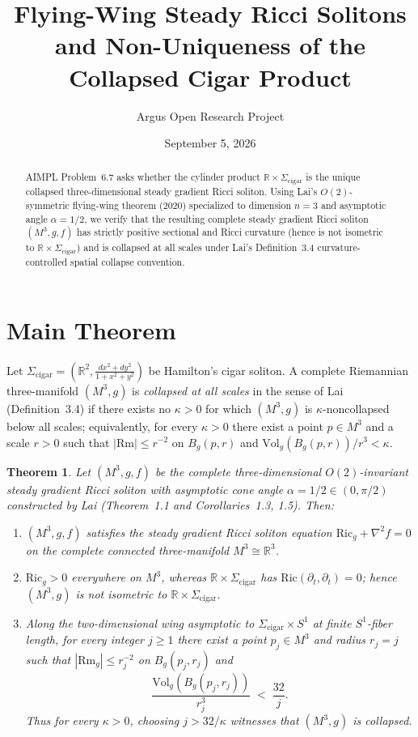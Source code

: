 \documentclass[10pt,reqno]{amsart}
\title[Flying-Wing Steady Ricci Solitons and Non-Uniqueness of the Cigar Product]
{Flying-Wing Steady Ricci Solitons and Non-Uniqueness of the Collapsed Cigar Product}
\author{Argus Open Research Project}
\date{September 5, 2026}
\newtheorem{theorem}{Theorem}[section]
\theoremstyle{definition}
\begin{document}
\begin{abstract}
AIMPL Problem~6.7 asks whether the cylinder product $\mathbb{R}\times\Sigma_{\mathrm{cigar}}$ is the unique collapsed three-dimensional steady gradient Ricci soliton. Using Lai's $O(2)$-symmetric flying-wing theorem (2020) specialized to dimension $n=3$ and asymptotic angle $\alpha=1/2$, we verify that the resulting complete steady gradient Ricci soliton $(M^3,g,f)$ has strictly positive sectional and Ricci curvature (hence is not isometric to $\mathbb{R}\times\Sigma_{\mathrm{cigar}}$) and is collapsed at all scales under Lai's Definition~3.4 curvature-controlled spatial collapse convention.
\end{abstract}
\maketitle
\section{Main Theorem}
Let $\Sigma_{\mathrm{cigar}}=(\mathbb{R}^2, \frac{dx^2+dy^2}{1+x^2+y^2})$ be Hamilton's cigar soliton. A complete Riemannian three-manifold $(M^3,g)$ is \emph{collapsed at all scales} in the sense of Lai (Definition~3.4) if there exists no $\kappa>0$ for which $(M^3,g)$ is $\kappa$-noncollapsed below all scales; equivalently, for every $\kappa>0$ there exist a point $p\in M^3$ and a scale $r>0$ such that $|\mathrm{Rm}|\le r^{-2}$ on $B_g(p,r)$ and $\mathrm{Vol}_g(B_g(p,r))/r^3 < \kappa$.
\begin{theorem}
Let $(M^3,g,f)$ be the complete three-dimensional $O(2)$-invariant steady gradient Ricci soliton with asymptotic cone angle $\alpha=1/2\in(0,\pi/2)$ constructed by Lai (Theorem~1.1 and Corollaries~1.3, 1.5). Then:
\begin{enumerate}[label=\textup{(\arabic*)}]
  \item $(M^3,g,f)$ satisfies the steady gradient Ricci soliton equation $\mathrm{Ric}_g + \nabla^2 f = 0$ on the complete connected three-manifold $M^3\cong\mathbb{R}^3$.
  \item $\mathrm{Ric}_g > 0$ everywhere on $M^3$, whereas $\mathbb{R}\times\Sigma_{\mathrm{cigar}}$ has $\mathrm{Ric}(\partial_t,\partial_t)=0$; hence $(M^3,g)$ is not isometric to $\mathbb{R}\times\Sigma_{\mathrm{cigar}}$.
  \item Along the two-dimensional wing asymptotic to $\Sigma_{\mathrm{cigar}}\times S^1$ at finite $S^1$-fiber length, for every integer $j\ge 1$ there exist a point $p_j\in M^3$ and radius $r_j=j$ such that $|\mathrm{Rm}_g|\le r_j^{-2}$ on $B_g(p_j,r_j)$ and
  \[
    \frac{\mathrm{Vol}_g(B_g(p_j,r_j))}{r_j^3} \;<\; \frac{32}{j}.
  \]
  Thus for every $\kappa>0$, choosing $j > 32/\kappa$ witnesses that $(M^3,g)$ is collapsed.
\end{enumerate}
\end{theorem}
\end{document}
